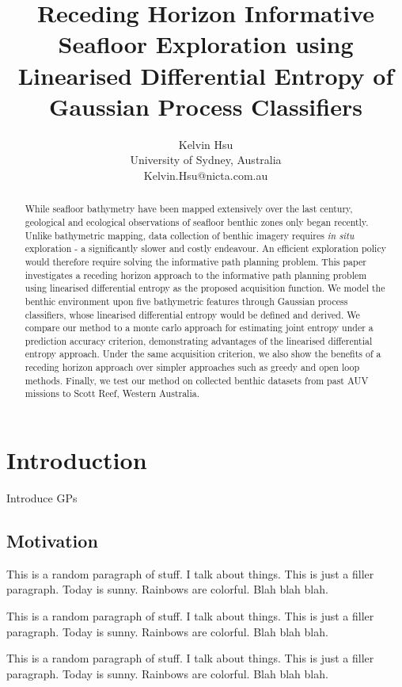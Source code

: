 \documentclass{article}
\title{Receding Horizon Informative Seafloor Exploration using Linearised Differential Entropy of Gaussian Process Classifiers}
\author{Kelvin Hsu \\ University of Sydney, Australia \\ 
Kelvin.Hsu@nicta.com.au}
\begin{document}
\maketitle

\begin{abstract}
	While seafloor bathymetry have been mapped extensively over the last century, geological and ecological observations of seafloor benthic zones only began recently. Unlike bathymetric mapping, data collection of benthic imagery requires \textit{in situ} exploration - a significantly slower and costly endeavour. An efficient exploration policy would therefore require solving the informative path planning problem. This paper investigates a receding horizon approach to the informative path planning problem using linearised differential entropy as the proposed acquisition function. We model the benthic environment upon five bathymetric features through Gaussian process classifiers, whose linearised differential entropy would be defined and derived. We compare our method to a monte carlo approach for estimating joint entropy under a prediction accuracy criterion, demonstrating advantages of the linearised differential entropy approach. Under the same acquisition criterion, we also show the benefits of a receding horizon approach over simpler approaches such as greedy and open loop methods. Finally, we test our method on collected benthic datasets from past AUV missions to Scott Reef, Western Australia. 
\end{abstract}

\section{Introduction}
\label{Section:Introduction}
	
	Introduce GPs \cite{GaussianProcessForMachineLearning}
	
	\subsection{Motivation}
		
		{\color{BurntOrange} This is a random paragraph of stuff. I talk about things. This is just a filler paragraph. Today is sunny. Rainbows are colorful. Blah blah blah.}
		
		{\color{BurntOrange} This is a random paragraph of stuff. I talk about things. This is just a filler paragraph. Today is sunny. Rainbows are colorful. Blah blah blah.}
		
		{\color{BurntOrange} This is a random paragraph of stuff. I talk about things. This is just a filler paragraph. Today is sunny. Rainbows are colorful. Blah blah blah.}
		
\end{document}
